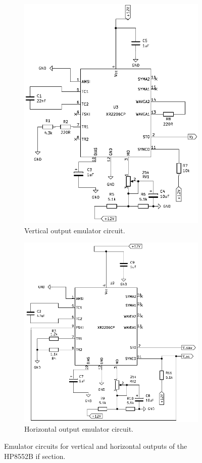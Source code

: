 \documentclass[class=report,11pt,crop=false]{standalone}
\begin{document}
	\begin{figure}[h!]
		\centering
		\begin{subfigure}{.5\textwidth}
			\centering
			\includegraphics[width=.8\linewidth]{Figures/Methodology/hp8552b-vertical-output-emulator-3}
			\caption{Vertical output emulator circuit.}
			\label{fig:vertical-output-emulator-ct-a}
		\end{subfigure}%
		\begin{subfigure}{.5\textwidth}
			\centering
			\includegraphics[width=.8\linewidth]{Figures/Methodology/hp8552b-horizontal-output-emulator-3}
			\caption{Horizontal output emulator circuit.}
			\label{fig:horizontal-output-emulator-ct-a}
		\end{subfigure}
		\caption{Emulator circuits for vertical and horizontal outputs of the HP8552B \acrshort{if} section.}
		\label{fig:hp8552B-vh-emulator}
	\end{figure}
	
\end{document}
